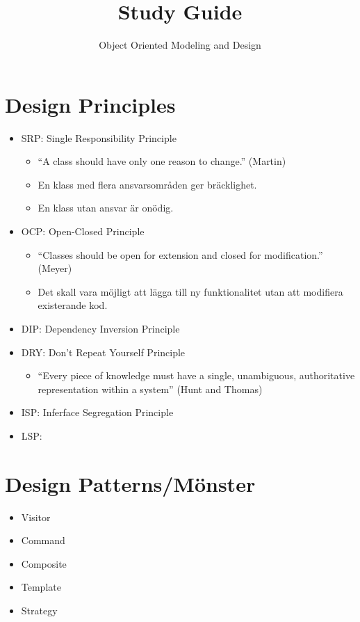 \documentclass[11pt]{amsart}
\title{Study Guide}
\author{Object Oriented Modeling and Design}
\begin{document}
\maketitle
\lstset{language=Java}

\section*{Design Principles}

\begin{itemize}
\item SRP: Single Responsibility Principle
	\begin{itemize}
	  \item ``A class should have only one reason to change.'' (Martin)
	  \item En klass med flera ansvarsområden ger bräcklighet.
	  \item En klass utan ansvar är onödig.
	\end{itemize}
\item OCP: Open-Closed Principle
	\begin{itemize}
	  \item ``Classes should be open for extension and closed for modification.''
	  (Meyer)
	  \item Det skall vara möjligt att lägga till ny funktionalitet utan att
	  modifiera existerande kod.
	\end{itemize}
\item DIP: Dependency Inversion Principle %
\item DRY: Don't Repeat Yourself Principle
	\begin{itemize}
	  \item ``Every piece of knowledge must have a single, unambiguous,
	  authoritative representation within a system'' (Hunt and Thomas)
	\end{itemize}
\item ISP: Inferface Segregation Principle
\item LSP: 
\end{itemize}

\section*{Design Patterns/Mönster}

\begin{itemize}
\item Visitor
\item Command
\item Composite
\item Template
\item Strategy
\end{itemize}
\end{document}
